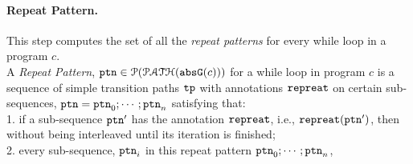 
\paragraph{Repeat Pattern.} This step computes the set of all the \emph{repeat patterns} for every while loop in a program $c$.
\\
  A \emph{Repeat Pattern},
  $\mathtt{ptn} \in \mathcal{P}(\mathcal{PATH}({\mathtt{abs}{\mathtt{G}}(c)}))$ for a while loop in program $c$ is
a sequence of simple transition paths $\mathtt{tp}$ with annotations $\mathtt{repreat}$ on certain sub-sequences,
$\mathtt{ptn} = \mathtt{ptn}_0; \cdots; \mathtt{ptn}_n$
satisfying that:
\\
1. if a sub-sequence $\mathtt{ptn}'$ has the annotation $\mathtt{repreat}$, i.e., $\mathtt{repreat}(\mathtt{ptn}')$,
then  without being interleaved until its iteration is finished;
\\
2. every sub-sequence, $\mathtt{ptn}_i$ in this repeat pattern $\mathtt{ptn}_0; \cdots; \mathtt{ptn}_n$,
